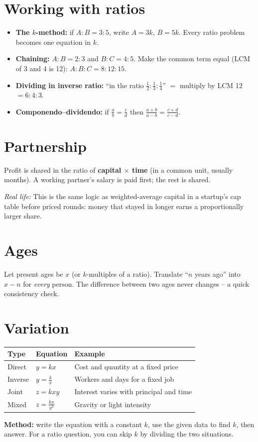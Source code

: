 \documentclass[11pt,a4paper,openany]{report}
\begin{document}
\section{Working with ratios}
\begin{itemize}
\item \textbf{The $k$-method:} if $A:B=3:5$, write $A=3k$, $B=5k$. Every ratio problem becomes one equation in $k$.
\item \textbf{Chaining:} $A:B=2:3$ and $B:C=4:5$. Make the common term equal (LCM of 3 and 4 is 12): $A:B:C=8:12:15$.
\item \textbf{Dividing in inverse ratio:} ``in the ratio $\frac12:\frac13:\frac14$'' $=$ multiply by LCM 12 $=6:4:3$.
\item \textbf{Componendo--dividendo:} if $\frac ab=\frac cd$ then $\frac{a+b}{a-b}=\frac{c+d}{c-d}$.
\end{itemize}

\section{Partnership}
Profit is shared in the ratio of \textbf{capital $\times$ time} (in a common unit, usually months). A working
partner's salary is paid first; the rest is shared.

\textit{Real life:} This is the same logic as weighted-average capital in a startup's cap table before
priced rounds: money that stayed in longer earns a proportionally larger share.

\section{Ages}
Let present ages be $x$ (or $k$-multiples of a ratio). Translate ``$n$ years ago'' into $x-n$ for \emph{every} person.
The difference between two ages never changes -- a quick consistency check.

\section{Variation}
\begin{center}\small
\begin{tabular}{lll}
\toprule
Type & Equation & Example\\\midrule
Direct & $y=kx$ & Cost and quantity at a fixed price\\
Inverse & $y=\frac kx$ & Workers and days for a fixed job\\
Joint & $z=kxy$ & Interest varies with principal and time\\
Mixed & $z=\frac{kx}{y^2}$ & Gravity or light intensity\\
\bottomrule
\end{tabular}
\end{center}
\textbf{Method:} write the equation with a constant $k$, use the given data to find $k$, then answer. For a ratio question, you can skip $k$ by dividing the two situations.
\end{document}
